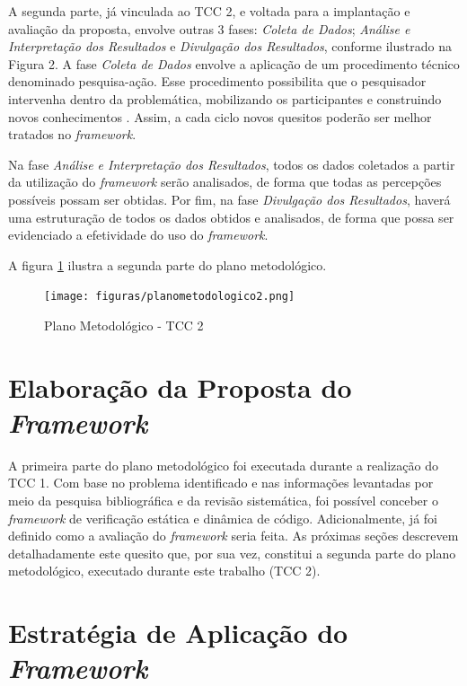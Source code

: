 \clearpage

A segunda parte, já vinculada ao TCC 2, e voltada para a implantação e avaliação da proposta, envolve outras 3 fases: \textit{Coleta de Dados}; \textit{Análise e Interpretação dos Resultados} e \textit{Divulgação dos Resultados}, conforme ilustrado na Figura 2.
A fase \textit{Coleta de Dados} envolve a aplicação de um procedimento técnico denominado pesquisa-ação. Esse procedimento possibilita que o pesquisador intervenha dentro da problemática, mobilizando os participantes e construindo novos conhecimentos \cite{pesquisa}. Assim, a cada ciclo novos quesitos poderão ser melhor tratados no \textit{framework}.

Na fase \textit{Análise e Interpretação dos Resultados}, todos os dados coletados a partir da utilização do \textit{framework} serão analisados, de forma que todas as percepções possíveis possam ser obtidas. Por fim, na fase \textit{Divulgação dos Resultados}, haverá uma estruturação de todos os dados obtidos e analisados, de forma que possa ser evidenciado a efetividade do uso do \textit{framework}.

A figura \ref{fig:plano2} ilustra a segunda parte do plano metodológico.

\begin{figure}[h]
\texttt{[image: figuras/planometodologico2.png]}
\caption{Plano Metodológico - TCC 2}
\label{fig:plano2}
\end{figure}

\section{Elaboração da Proposta do \textit{Framework}}

A primeira parte do plano metodológico foi executada durante a realização do TCC 1. Com base no problema identificado e nas informações levantadas por meio da pesquisa bibliográfica e da revisão sistemática, foi possível conceber o \textit{framework} de verificação estática e dinâmica de código. Adicionalmente, já foi definido como a avaliação do \textit{framework} seria feita. As próximas seções descrevem detalhadamente este quesito que, por sua vez, constitui a segunda parte do plano metodológico, executado durante este trabalho (TCC 2).

\section{Estratégia de Aplicação do \textit{Framework}}


